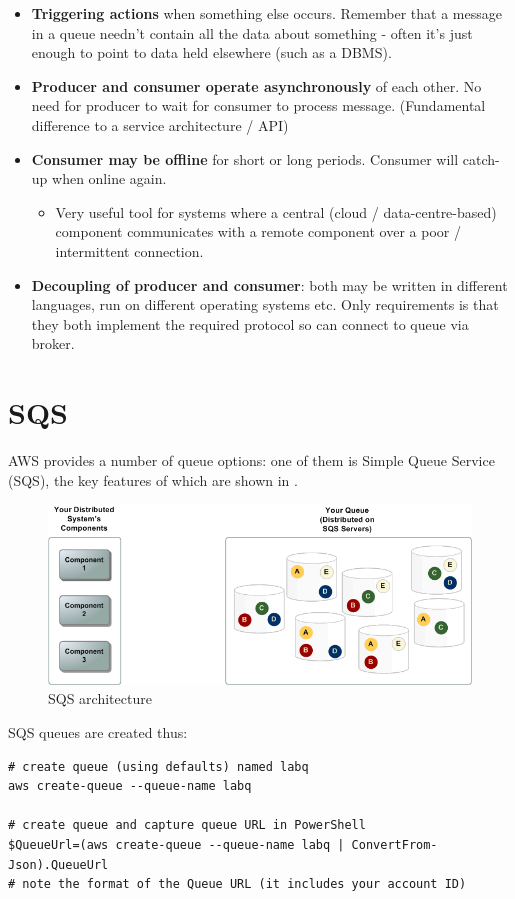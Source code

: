 \documentclass{pgnotes}
\begin{document}
\begin{itemize}
\item
  \textbf{Triggering actions} when something else occurs. Remember that
  a message in a queue needn't contain all the data about something -
  often it's just enough to point to data held elsewhere (such as a
  DBMS).
\item
  \textbf{Producer and consumer operate asynchronously} of each other.
  No need for producer to wait for consumer to process message.
  (Fundamental difference to a service architecture / API)
\item
  \textbf{Consumer may be offline} for short or long periods. Consumer
  will catch-up when online again.

  \begin{itemize}
  
  \item
    Very useful tool for systems where a central (cloud /
    data-centre-based) component communicates with a remote component
    over a poor / intermittent connection.
  \end{itemize}
\item
  \textbf{Decoupling of producer and consumer}: both may be written in
  different languages, run on different operating systems etc. Only
  requirements is that they both implement the required protocol so can
  connect to queue via broker.
\end{itemize}

\section{SQS}\label{sqs}

AWS provides a number of queue options: one of them is Simple Queue
Service (SQS), the key features of which are shown in .

\begin{figure}
\centering
\includegraphics[width=0.6\linewidth]{sqs_architecture}
\caption{SQS architecture{}}
\end{figure}

SQS queues are created thus:

\begin{verbatim}
# create queue (using defaults) named labq
aws create-queue --queue-name labq

# create queue and capture queue URL in PowerShell
$QueueUrl=(aws create-queue --queue-name labq | ConvertFrom-Json).QueueUrl
# note the format of the Queue URL (it includes your account ID)
\end{verbatim}
\end{document}
